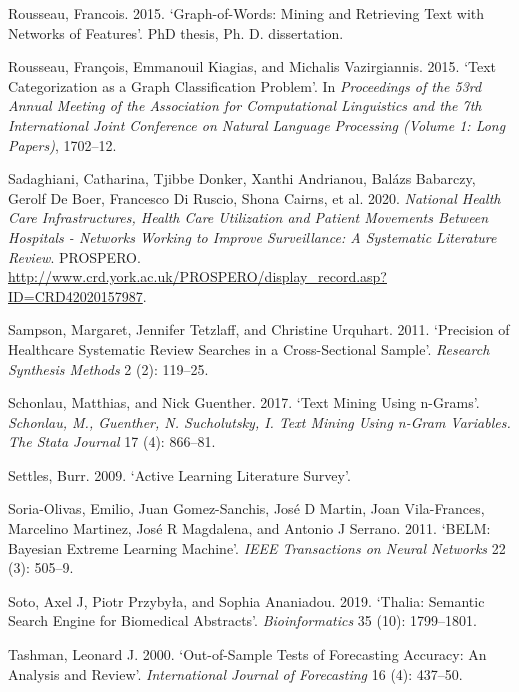 \documentclass{article}
\newlength{\cslhangindent}
\newenvironment{CSLReferences}[2] %
 {%
  \setlength{\parindent}{0pt}
  \ifodd #1 \everypar{\setlength{\hangindent}{\cslhangindent}}\ignorespaces\fi
  \ifnum #2 > 0
  \setlength{\parskip}{#2\baselineskip}
  \fi
 }%
 {}
\begin{document}
\begin{CSLReferences}{1}{0}
\leavevmode{}%
Rousseau, Francois. 2015. {`Graph-of-Words: Mining and Retrieving Text
with Networks of Features'}. PhD thesis, Ph. D. dissertation.

\leavevmode{}%
Rousseau, François, Emmanouil Kiagias, and Michalis Vazirgiannis. 2015.
{`Text Categorization as a Graph Classification Problem'}. In
\emph{Proceedings of the 53rd Annual Meeting of the Association for
Computational Linguistics and the 7th International Joint Conference on
Natural Language Processing (Volume 1: Long Papers)}, 1702--12.

\leavevmode{}%
Sadaghiani, Catharina, Tjibbe Donker, Xanthi Andrianou, Balázs Babarczy,
Gerolf De Boer, Francesco Di Ruscio, Shona Cairns, et al. 2020.
\emph{National Health Care Infrastructures, Health Care Utilization and
Patient Movements Between Hospitals - Networks Working to Improve
Surveillance: A Systematic Literature Review}. PROSPERO.
\url{http://www.crd.york.ac.uk/PROSPERO/display_record.asp?ID=CRD42020157987}.

\leavevmode{}%
Sampson, Margaret, Jennifer Tetzlaff, and Christine Urquhart. 2011.
{`Precision of Healthcare Systematic Review Searches in a
Cross-Sectional Sample'}. \emph{Research Synthesis Methods} 2 (2):
119--25.

\leavevmode{}%
Schonlau, Matthias, and Nick Guenther. 2017. {`Text Mining Using
n-Grams'}. \emph{Schonlau, M., Guenther, N. Sucholutsky, I. Text Mining
Using n-Gram Variables. The Stata Journal} 17 (4): 866--81.

\leavevmode{}%
Settles, Burr. 2009. {`Active Learning Literature Survey'}.

\leavevmode{}%
Soria-Olivas, Emilio, Juan Gomez-Sanchis, José D Martin, Joan
Vila-Frances, Marcelino Martinez, José R Magdalena, and Antonio J
Serrano. 2011. {`BELM: Bayesian Extreme Learning Machine'}. \emph{IEEE
Transactions on Neural Networks} 22 (3): 505--9.

\leavevmode{}%
Soto, Axel J, Piotr Przybyła, and Sophia Ananiadou. 2019. {`Thalia:
Semantic Search Engine for Biomedical Abstracts'}. \emph{Bioinformatics}
35 (10): 1799--1801.

\leavevmode{}%
Tashman, Leonard J. 2000. {`Out-of-Sample Tests of Forecasting Accuracy:
An Analysis and Review'}. \emph{International Journal of Forecasting} 16
(4): 437--50.


\end{CSLReferences}
\end{document}
